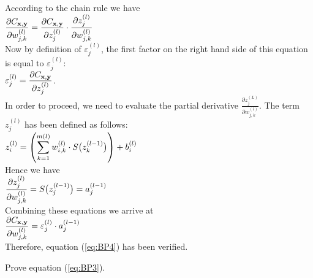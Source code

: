 According to the chain rule we have
\\[0.2cm]
\hspace*{1.3cm}
$ \displaystyle\frac{\partial C_{\mathbf{x}, \mathbf{y}}}{\partial w_{j,k}^{(l)}}  =  
  \frac{\partial C_{\mathbf{x}, \mathbf{y}}}{\partial z_j^{(l)}} \cdot \frac{\partial z_j^{(l)}}{\partial w_{j,k}^{(l)}} 
$ 
\\[0.2cm]
Now by definition of $\varepsilon_j^{(l)}$, the first factor on the right hand side of this equation is equal to $\varepsilon_j^{(l)}$: 
\\[0.2cm]
\hspace*{1.3cm}
$\displaystyle \varepsilon_j^{(l)} = \frac{\partial C_{\mathbf{x}, \mathbf{y}}}{\partial z_j^{(l)}}$.
\\[0.2cm]
In order to proceed, we need to evaluate the partial derivative
$\frac{\partial z_j^{(L)}}{\partial w_{j,k}^{(l)}}$.  The term $z_j^{(l)}$ has been defined as follows:
\\[0.2cm]
\hspace*{1.3cm}
$\displaystyle z_i^{(l)} = \left(\sum\limits_{k=1}^{m(l)} w_{i,k}^{(l)} \cdot S\bigl(z_k^{(l-1)}\bigr)\right) + b_i^{(l)}$
\\[0.2cm]
Hence we have
\\[0.2cm]
\hspace*{1.3cm}
$\displaystyle\frac{\partial z_j^{(l)}}{\partial w_{j,k}^{(l)}} = S\bigl(z_j^{(l-1)}\bigr) = a_j^{(l-1)}$ 
\\[0.2cm]
Combining these equations we arrive at
\\[0.2cm]
\hspace*{1.3cm}
$ \displaystyle\frac{\partial C_{\mathbf{x}, \mathbf{y}}}{\partial w_{j,k}^{(l)}}  =  
  \varepsilon_j^{(l)} \cdot a_j^{(l-1)}
$ 
\\[0.2cm]
Therefore, equation (\ref{eq:BP4}) has been verified.

\exercise
Prove equation (\ref{eq:BP3}).
\eoxs

